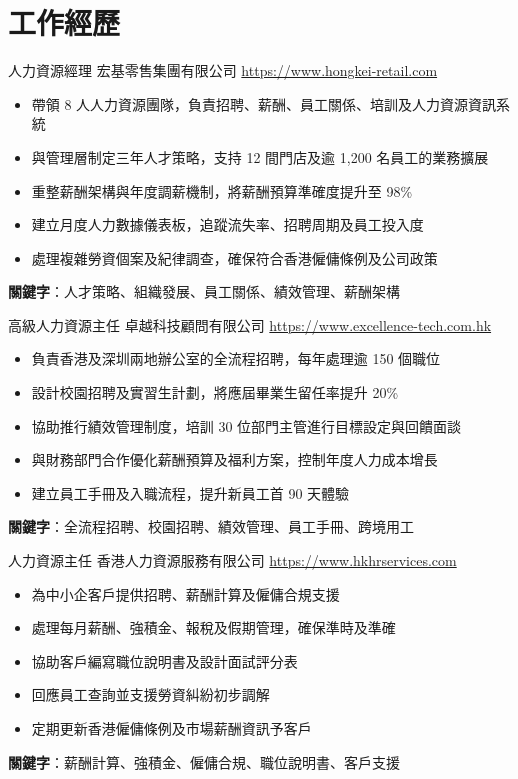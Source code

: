 \documentclass[a4paper, serif, 10pt]{moderncv}
\begin{document}
\section{工作經歷}

        {人力資源經理}
        {宏基零售集團有限公司}
        {\url{https://www.hongkei-retail.com}}
        {}
        {\begin{itemize}
\item 帶領 8 人人力資源團隊，負責招聘、薪酬、員工關係、培訓及人力資源資訊系統
\item 與管理層制定三年人才策略，支持 12 間門店及逾 1,200 名員工的業務擴展
\item 重整薪酬架構與年度調薪機制，將薪酬預算準確度提升至 98\%
\item 建立月度人力數據儀表板，追蹤流失率、招聘周期及員工投入度
\item 處理複雜勞資個案及紀律調查，確保符合香港僱傭條例及公司政策
\end{itemize}
\textbf{關鍵字}：人才策略、組織發展、員工關係、績效管理、薪酬架構}

        {高級人力資源主任}
        {卓越科技顧問有限公司}
        {\url{https://www.excellence-tech.com.hk}}
        {}
        {\begin{itemize}
\item 負責香港及深圳兩地辦公室的全流程招聘，每年處理逾 150 個職位
\item 設計校園招聘及實習生計劃，將應屆畢業生留任率提升 20\%
\item 協助推行績效管理制度，培訓 30 位部門主管進行目標設定與回饋面談
\item 與財務部門合作優化薪酬預算及福利方案，控制年度人力成本增長
\item 建立員工手冊及入職流程，提升新員工首 90 天體驗
\end{itemize}
\textbf{關鍵字}：全流程招聘、校園招聘、績效管理、員工手冊、跨境用工}

        {人力資源主任}
        {香港人力資源服務有限公司}
        {\url{https://www.hkhrservices.com}}
        {}
        {\begin{itemize}
\item 為中小企客戶提供招聘、薪酬計算及僱傭合規支援
\item 處理每月薪酬、強積金、報稅及假期管理，確保準時及準確
\item 協助客戶編寫職位說明書及設計面試評分表
\item 回應員工查詢並支援勞資糾紛初步調解
\item 定期更新香港僱傭條例及市場薪酬資訊予客戶
\end{itemize}
\textbf{關鍵字}：薪酬計算、強積金、僱傭合規、職位說明書、客戶支援}
\end{document}
